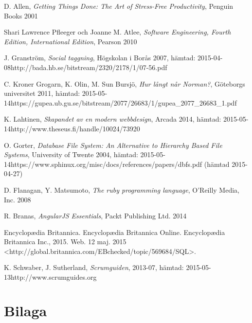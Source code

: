 \documentclass[a4paper,12pt,oneside,final]{extbook}
\begin{document}
\begin{thebibliography}{99}

  D. Allen, \emph{Getting Things Done: The Art of Stress-Free Productivity}, Penguin Books 2001
  
  Shari Lawrence Pfleeger och Joanne M. Atlee, \emph{Software Engineering, Fourth Edition, International Edition}, Pearson 2010

  J. Granström, \emph{Social taggning}, Högskolan i Borås 2007, hämtad: 2015-04-08\newline http://bada.hb.se/bitstream/2320/2178/1/07-56.pdf

  C. Kroner Grogarn, K. Olin, M. Sun Bursjö, \emph{Hur långt når Norman?}, Göteborgs universitet 2011, hämtad: 2015-05-14\newline https://gupea.ub.gu.se/bitstream/2077/26683/1/gupea\_2077\_26683\_1.pdf

  K. Lahtinen, \emph{Skapandet av en modern webbdesign}, Arcada 2014, hämtad: 2015-05-14\newline http://www.theseus.fi/handle/10024/73920

  O. Gorter, \emph{Database File System: An Alternative to Hierarchy Based File Systems}, University of Twente 2004, hämtad: 2015-05-14\newline https://www.sphinux.org/misc/docs/references/papers/dbfs.pdf (hämtad 2015-04-27)

  D. Flanagan, Y. Matsumoto, \emph{The ruby programming language}, O'Reilly Media, Inc. 2008

  R. Branas, \emph{AngularJS Essentials}, Packt Publishing Ltd. 2014

  Encyclopædia Britannica. Encyclopædia Britannica Online. Encyclopædia Britannica Inc., 2015. Web. 12 maj. 2015 <http://global.britannica.com/EBchecked/topic/569684/SQL>.

 K. Schwaber, J. Sutherland, \emph{Scrumguiden}, 2013-07, hämtad: 2015-05-13\newline http://www.scrumguides.org

\bibitem{}
\bibitem{}
\bibitem{}
\bibitem{}
\bibitem{}
\bibitem{}
\bibitem{}
\bibitem{}
\bibitem{}
\bibitem{}
\bibitem{}

\end{thebibliography}


\appendix

\chapter{Bilaga}
\end{document}
